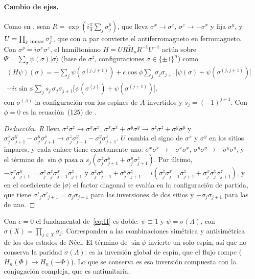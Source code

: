 \documentclass[11pt,a4paper]{article}
\theoremstyle{remark}
\newcommand{\ket}[1]{|#1\rangle}
\begin{document}
\paragraph{Cambio de ejes.} Como en \cite{dk-kink}, sean $R=\exp(i\tfrac\pi4\sum_j\sigma^y_j)$, que lleva
$\sigma^x\to\sigma^z$, $\sigma^z\to-\sigma^x$ y fija $\sigma^y$, y $U=\prod_{j\ \rm impar}\sigma^z_j$,
que con $n$ par convierte el antiferromagneto en ferromagneto. Con $\sigma^y=i\sigma^x\sigma^z$, el
hamiltoniano $H=UR\widetilde H_nR^{-1}U^{-1}$ actúa sobre $\Psi=\sum_\sigma\psi(\sigma)\ket\sigma$
(base de $\sigma^z$, configuraciones $\sigma\in\{\pm1\}^n$) como
\begin{multline}\label{eq:H}
  (H\psi)(\sigma)=-\sum_j\psi(\sigma^{(j,j+1)})+\epsilon\cos\phi\sum_j\sigma_j\sigma_{j+1}\big[\psi(\sigma)+\psi(\sigma^{(j,j+1)})\big]\\
  -i\epsilon\sin\phi\sum_js_j\,\sigma_j\sigma_{j+1}\big[\psi(\sigma^{(j)})+\psi(\sigma^{(j+1)})\big],
\end{multline}
con $\sigma^{(A)}$ la configuración con los espines de $A$ invertidos y $s_j=(-1)^{j+1}$. Con
$\phi=0$ es la ecuación~(125) de \cite{dk-kink}.

\begin{proof}[Deducción]
$R$ lleva $\sigma^z\sigma^z\to\sigma^x\sigma^x$, $\sigma^x\sigma^x+\sigma^y\sigma^y\to\sigma^z\sigma^z+\sigma^y\sigma^y$
y $\sigma^x_j\sigma^y_{j+1}-\sigma^y_j\sigma^x_{j+1}\to\sigma^z_j\sigma^y_{j+1}-\sigma^y_j\sigma^z_{j+1}$. $U$
cambia el signo de $\sigma^x$ y $\sigma^y$ en los sitios impares, y cada enlace tiene exactamente
uno: $\sigma^x\sigma^x\to-\sigma^x\sigma^x$, $\sigma^y\sigma^y\to-\sigma^y\sigma^y$, y el término de $\sin\phi$
pasa a $s_j(\sigma^z_j\sigma^y_{j+1}+\sigma^y_j\sigma^z_{j+1})$. Por último,
$-\sigma^y_j\sigma^y_{j+1}=\sigma^x_j\sigma^z_j\sigma^x_{j+1}\sigma^z_{j+1}$ y
$\sigma^z_j\sigma^y_{j+1}+\sigma^y_j\sigma^z_{j+1}=i(\sigma^z_j\sigma^x_{j+1}\sigma^z_{j+1}+\sigma^x_j\sigma^z_j\sigma^z_{j+1})$, y en
el coeficiente de $\ket\sigma$ el factor diagonal se evalúa en la configuración de partida, que
tiene $\sigma'_j\sigma'_{j+1}=\sigma_j\sigma_{j+1}$ para las inversiones de dos sitios y
$-\sigma_j\sigma_{j+1}$ para las de uno.
\end{proof}

Con $\epsilon=0$ el fundamental de~\eqref{eq:H} es doble: $\psi\equiv1$ y $\psi=\sigma(\Lambda)$, con
$\sigma(X)=\prod_{j\in X}\sigma_j$. Corresponden a las combinaciones simétrica y antisimétrica de los
dos estados de Néel. El término de $\sin\phi$ invierte un solo espín, así que no conserva la
paridad $\sigma(\Lambda)$: es la inversión global de espín, que el flujo rompe ($H_n(\Phi)\to
H_n(-\Phi)$). Lo que se conserva es esa inversión compuesta con la conjugación compleja, que es
antiunitaria.
\end{document}
